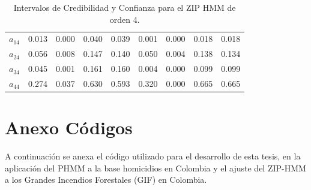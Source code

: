 \documentclass[a4paper]{article}\usepackage[]{graphicx}\usepackage[]{color}
\begin{document}
\begin{table}[ht]
\begin{tabular}{lrrrrrrrr}
  $a_{14}$ & 0.013 & 0.000 & 0.040 & 0.039 & 0.001 & 0.000 & 0.018 & 0.018 \\ 
  $a_{24}$ & 0.056 & 0.008 & 0.147 & 0.140 & 0.050 & 0.004 & 0.138 & 0.134 \\ 
  $a_{34}$ & 0.045 & 0.001 & 0.161 & 0.160 & 0.004 & 0.000 & 0.099 & 0.099 \\ 
  $a_{44}$ & 0.274 & 0.037 & 0.630 & 0.593 & 0.320 & 0.000 & 0.665 & 0.665 \\ 
   \bottomrule
\end{tabular}
\caption{Intervalos de Credibilidad y Confianza para el ZIP HMM de orden 4.} 
\end{table}


\clearpage

\section{Anexo Códigos}

A continuación se anexa el código utilizado para el desarrollo de esta tesis, en la aplicación del PHMM a la base homicidios en Colombia y el ajuste del ZIP-HMM a los Grandes Incendios Forestales (GIF) en Colombia. 
\end{document}
